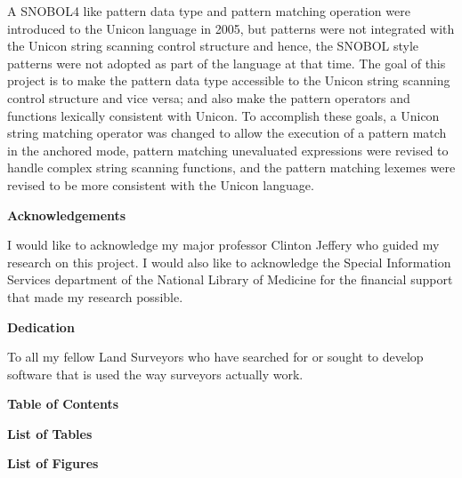 \documentclass{article}
\begin{document}
A SNOBOL4 like pattern data type and pattern matching operation were introduced to the Unicon language in 2005, but patterns were not integrated with the Unicon string scanning control structure and hence, the SNOBOL style patterns were not adopted as part of the language at that time.  The goal of this project is to make the pattern data type accessible to the Unicon string scanning control structure and vice versa; and also make the pattern operators and functions lexically consistent with Unicon.  To accomplish these goals, a Unicon string matching operator was changed to allow the execution of a pattern match in the anchored mode, pattern matching unevaluated expressions were revised to handle complex string scanning functions, and the pattern matching lexemes were revised to be more consistent with the Unicon language.

\pagebreak

\begin{center}
\textbf{Acknowledgements}
\end{center}
I would like to acknowledge my major professor Clinton Jeffery who guided my research on this project.  I would also like to acknowledge the Special Information Services department of the National Library of Medicine for the financial support that made my research possible.

\pagebreak
\vspace*{\fill}
\begin{center}
\textbf{Dedication}
\end{center}
To all my fellow Land Surveyors who have searched for or sought to develop software that is used the way surveyors actually work. 
\vspace*{\fill}

\pagebreak
\linespread{1}
\begin{center}
\textbf{Table of Contents}
\end{center}
\tableofcontents

\pagebreak
\begin{center}
\textbf{List of Tables}
\end{center}
\listoftables
	
\pagebreak
\begin{center}
\textbf{List of Figures}
\end{center}
\listoffigures
\end{document}
